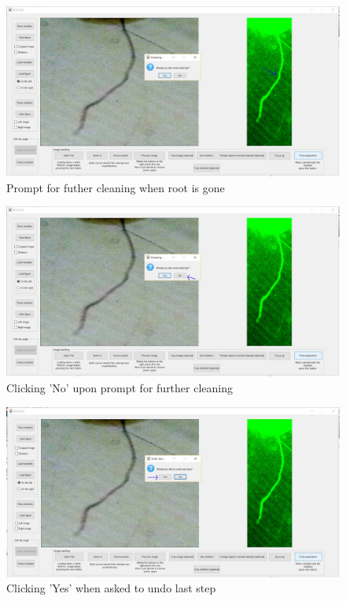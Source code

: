 \begin{figure}[H]
	\centering
	\includegraphics[width=\textwidth]{../Figures/manual/optionalA4.jpg}
	\caption{Prompt for futher cleaning when root is gone}
	\label{fig:img33}
\end{figure}

\begin{figure}[H]
	\centering
	\includegraphics[width=\textwidth]{../Figures/manual/optionalA5.jpg}
	\caption{Clicking 'No' upon prompt for further cleaning}
	\label{fig:img34}
\end{figure}

\begin{figure}[H]
	\centering
	\includegraphics[width=\textwidth]{../Figures/manual/optionalA6.jpg}
	\caption{Clicking 'Yes' when asked to undo last step}
	\label{fig:img35}
\end{figure}

